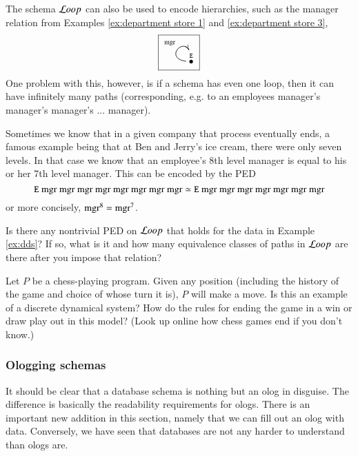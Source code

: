 \begin{example}\label{ex:finite hierarchy}

The schema ${\mathcal{L} oop}$ can also be used to encode hierarchies, such as the manager relation from Examples \ref{ex:department store 1} and \ref{ex:department store 3}, 
$$\fbox{\xymatrix{\LTO{E}\ar@(l,u)[]^{\tn{mgr}}}}$$
One problem with this, however, is if a schema has even one loop, then it can have infinitely many paths (corresponding, e.g. to an employees manager's manager's manager's ... manager). 

Sometimes we know that in a given company that process eventually ends, a famous example being that at Ben and Jerry's ice cream, there were only seven levels. In that case we know that an employee's 8th level manager is equal to his or her 7th level manager. This can be encoded by the PED $${\tt E} \tn{ mgr}\tn{ mgr}\tn{ mgr}\tn{ mgr}\tn{ mgr}\tn{ mgr}\tn{ mgr}\tn{ mgr}\simeq{\tt E}\tn{ mgr}\tn{ mgr}\tn{ mgr}\tn{ mgr}\tn{ mgr}\tn{ mgr}\tn{ mgr}$$ or more concisely, $\tn{mgr}^8=\tn{mgr}^7$.

\end{example}

\begin{exercise}
Is there any nontrivial PED on ${\mathcal{L} oop}$ that holds for the data in Example \ref{ex:dds}? If so, what is it and how many equivalence classes of paths in ${\mathcal{L} oop}$ are there after you impose that relation?
\end{exercise}

\begin{exercise}
Let $P$ be a chess-playing program. Given any position (including the history of the game and choice of whose turn it is), $P$ will make a move. 
\sexc Is this an example of a discrete dynamical system? 
\next How do the rules for ending the game in a win or draw play out in this model? (Look up online how chess games end if you don't know.)
\endsexc
\end{exercise}


\subsubsection{Ologging schemas}\label{sec:olog as db schema}

It should be clear that a database schema is nothing but an olog in disguise. The difference is basically the readability requirements for ologs. There is an important new addition in this section, namely that we can fill out an olog with data. Conversely, we have seen that databases are not any harder to understand than ologs are.

